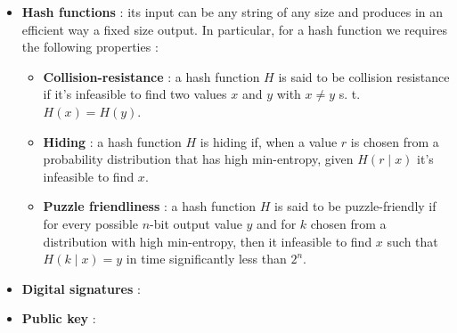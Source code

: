\begin{itemize}
\item \textbf{Hash functions} : its input can be any string of any size and produces in an efficient way a fixed size output. In particular, for a hash function we requires the following properties :
\begin{itemize}
\item \textbf{Collision-resistance} : a hash function $H$ is said to be collision resistance if it's infeasible to find two values $x$ and $y$  with $x \neq y$ s. t. $H(x) = H(y)$.
\item \textbf{Hiding} : a hash function $H$ is hiding if, when a value $r$ is chosen from a probability distribution that has high min-entropy, given $H(r \mid x)$ it's infeasible to find $x$.
\item \textbf{Puzzle friendliness} : a hash function $H$ is said to be puzzle-friendly if for every possible $n$-bit output value $y$ and for $k$ chosen from a distribution with high min-entropy, then it infeasible to find $x$ such that $H(k \mid x) = y$ in time significantly less than $2^{n}$.
\end{itemize}
\item \textbf{Digital signatures} : 
\item \textbf{Public key} :
\end{itemize}
